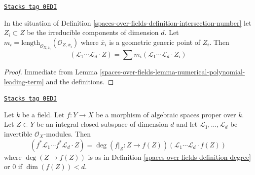 \begin{lemma}
\label{spaces-over-fields-lemma-intersection-number-in-terms-of-components}
\href{https://stacks.math.columbia.edu/tag/0EDI}{\texttt{Stacks tag 0EDI}}

In the situation of Definition \ref{spaces-over-fields-definition-intersection-number}
let $Z_i \subset Z$ be the irreducible components of dimension $d$. Let
$m_i = \text{length}_{\mathcal{O}_{X, \overline{x}_i}}
(\mathcal{O}_{Z, \overline{x}_i})$
where $\overline{x}_i$ is a geometric generic point of $Z_i$. Then
$$
(\mathcal{L}_1 \cdots \mathcal{L}_d \cdot Z) =
\sum m_i(\mathcal{L}_1 \cdots \mathcal{L}_d \cdot Z_i)
$$
\end{lemma}

\begin{proof}
Immediate from Lemma \ref{spaces-over-fields-lemma-numerical-polynomial-leading-term}
and the definitions.
\end{proof}

\begin{lemma}
\label{spaces-over-fields-lemma-intersection-number-and-pullback}
\href{https://stacks.math.columbia.edu/tag/0EDJ}{\texttt{Stacks tag 0EDJ}}

Let $k$ be a field. Let $f : Y \to X$ be a morphism of
algebraic spaces proper over $k$.
Let $Z \subset Y$ be an integral closed subspace of dimension $d$ and let
$\mathcal{L}_1, \ldots, \mathcal{L}_d$ be invertible $\mathcal{O}_X$-modules.
Then
$$
(f^*\mathcal{L}_1 \cdots f^*\mathcal{L}_d \cdot Z) =
\deg(f|_Z : Z \to f(Z)) (\mathcal{L}_1 \cdots \mathcal{L}_d \cdot f(Z))
$$
where $\deg(Z \to f(Z))$ is as in Definition \ref{spaces-over-fields-definition-degree}
or $0$ if $\dim(f(Z)) < d$.
\end{lemma}

